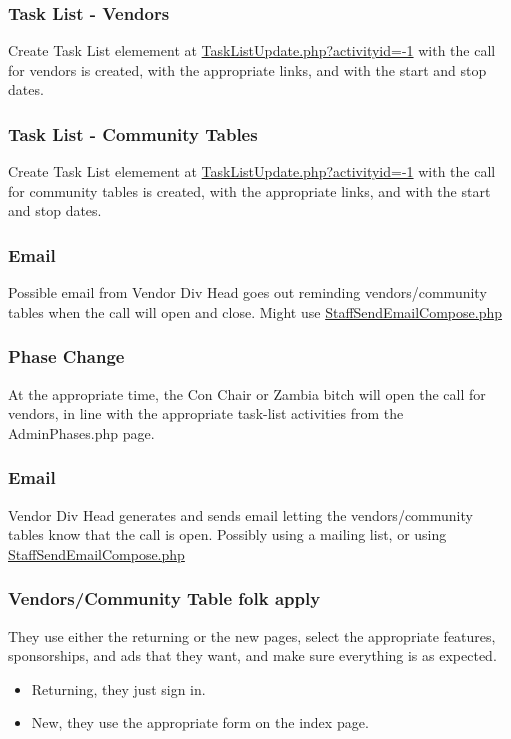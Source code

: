 \documentclass[captions=tablesignature]{scrartcl}
\begin{document}
\subsubsection{Task List - Vendors}
\label{sec-3-2-7}
Create Task List elemement at \href{../webpages/TaskListUpdate.php?activityid=-1}{TaskListUpdate.php?activityid=-1}
with the call for vendors is created, with the appropriate links,
and with the start and stop dates.

\subsubsection{Task List - Community Tables}
\label{sec-3-2-8}
Create Task List elemement at \href{../webpages/TaskListUpdate.php?activityid=-1}{TaskListUpdate.php?activityid=-1}
with the call for community tables is created, with the
appropriate links, and with the start and stop dates.

\subsubsection{Email}
\label{sec-3-2-9}
Possible email from Vendor Div Head goes out reminding
vendors/community tables when the call will open and close.
Might use \href{../webpages/StaffSendEmailCompose.php}{StaffSendEmailCompose.php}

\subsubsection{Phase Change}
\label{sec-3-2-10}
At the appropriate time, the Con Chair or Zambia bitch will open
the call for vendors, in line with the appropriate task-list
activities from the AdminPhases.php page.

\subsubsection{Email}
\label{sec-3-2-11}
Vendor Div Head generates and sends email letting the
vendors/community tables know that the call is open.
Possibly using a mailing list, or using \href{../webpages/StaffSendEmailCompose.php}{StaffSendEmailCompose.php}

\subsubsection{Vendors/Community Table folk apply}
\label{sec-3-2-12}
They use either the returning or the new pages, select the
appropriate features, sponsorships, and ads that they want, and
make sure everything is as expected.
\begin{itemize}
\item Returning, they just sign in.
\item New, they use the appropriate form on the index page.
\end{itemize}
\end{document}
